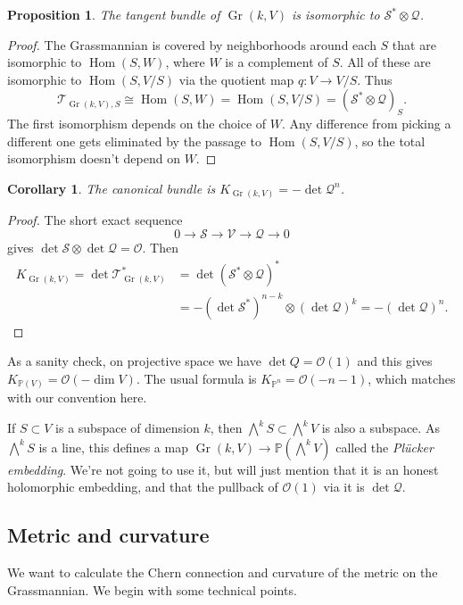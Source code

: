 \documentclass[11pt]{article}
\newtheorem{prop}[theo]{Proposition}
\newtheorem{coro}[theo]{Corollary}
\newtheorem*{proof}{Proof}
\newcommand{\kk}[1]{\mathbb{#1}}
\newcommand{\cc}[1]{\mathcal{#1}}
\def\qedhere{}
\DeclareMathOperator{\Gr}{Gr}
\DeclareMathOperator{\Hom}{Hom}
\begin{document}
\begin{prop}
The tangent bundle of $\Gr(k,V)$ is isomorphic to $\cc S^* \otimes \cc Q$.
\end{prop}


\begin{proof}
The Grassmannian is covered by neighborhoods around each $S$ that are isomorphic to $\Hom(S, W)$, where $W$ is a complement of $S$. All of these are isomorphic to $\Hom(S, V/S)$ via the quotient map $q : V \to V/S$. Thus
\[
\cc T_{\Gr(k,V),S}
\cong \Hom(S,W)
= \Hom(S,V/S)
= (\cc S^* \otimes \cc Q)_S.
\]
The first isomorphism depends on the choice of $W$. Any difference from picking a different one gets eliminated by the passage to $\Hom(S,V/S)$, so the total isomorphism doesn't depend on $W$.
\end{proof}


\begin{coro}
The canonical bundle is $K_{\Gr(k, V)} = -\det \cc Q^{n}$.
\end{coro}

\begin{proof}
The short exact sequence
$$
0 \to \cc S \to \cc V \to \cc Q \to 0
$$
gives $\det \cc S \otimes \det \cc Q = \cc O$. Then
\begin{align*}
K_{\Gr(k,V)}
= \det \cc T_{\Gr(k,V)}^*
&= \det (\cc S^* \otimes \cc Q)^*
\\
&= - (\det \cc S^*)^{n-k} \otimes (\det \cc Q)^k
= - (\det \cc Q)^{n}.
\qedhere
\end{align*}
\end{proof}

As a sanity check, on projective space we have $\det Q = \cc O(1)$ and this gives $K_{\kk P(V)} = \cc O(-\dim V)$. The usual formula is $K_{\kk P^n} = \cc O(-n-1)$, which matches with our convention here.


If $S \subset V$ is a subspace of dimension $k$, then $\bigwedge^k S \subset \bigwedge^k V$ is also a subspace. As $\bigwedge^k S$ is a line, this defines a map $\Gr(k,V) \to \kk P(\bigwedge^k V)$ called the \emph{Pl\"ucker embedding}. We're not going to use it, but will just mention that it is an honest holomorphic embedding, and that the pullback of $\cc O(1)$ via it is $\det \cc Q$.



\subsection{Metric and curvature}


We want to calculate the Chern connection and curvature of the metric on the Grassmannian. We begin with some technical points.
\end{document}
